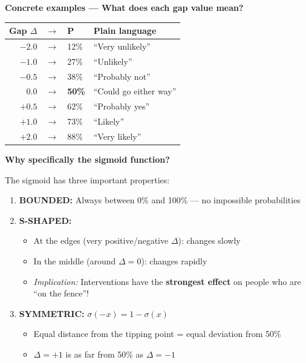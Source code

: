 \begin{intuition}
\textbf{Concrete examples --- What does each gap value mean?}

\begin{center}
\begin{tabular}{rclp{5cm}}
\toprule
\textbf{Gap $\Delta$} & $\rightarrow$ & \textbf{P} & \textbf{Plain language}\\
\midrule
$-2.0$ & $\rightarrow$ & 12\% & ``Very unlikely''\\
$-1.0$ & $\rightarrow$ & 27\% & ``Unlikely''\\
$-0.5$ & $\rightarrow$ & 38\% & ``Probably not''\\
\midrule
$0.0$ & $\rightarrow$ & \textbf{50\%} & ``Could go either way''\\
\midrule
$+0.5$ & $\rightarrow$ & 62\% & ``Probably yes''\\
$+1.0$ & $\rightarrow$ & 73\% & ``Likely''\\
$+2.0$ & $\rightarrow$ & 88\% & ``Very likely''\\
\bottomrule
\end{tabular}
\end{center}
\end{intuition}

\begin{intuition}
\textbf{Why specifically the sigmoid function?}

The sigmoid has three important properties:

\begin{enumerate}
\item \textbf{BOUNDED:} Always between 0\% and 100\% --- no impossible probabilities

\item \textbf{S-SHAPED:} 
\begin{itemize}
\item At the edges (very positive/negative $\Delta$): changes slowly
\item In the middle (around $\Delta = 0$): changes rapidly
\item \textit{Implication:} Interventions have the \textbf{strongest effect} on people who are ``on the fence''!
\end{itemize}

\item \textbf{SYMMETRIC:} $\sigma(-x) = 1 - \sigma(x)$
\begin{itemize}
\item Equal distance from the tipping point = equal deviation from 50\%
\item $\Delta = +1$ is as far from 50\% as $\Delta = -1$
\end{itemize}
\end{enumerate}
\end{intuition}

